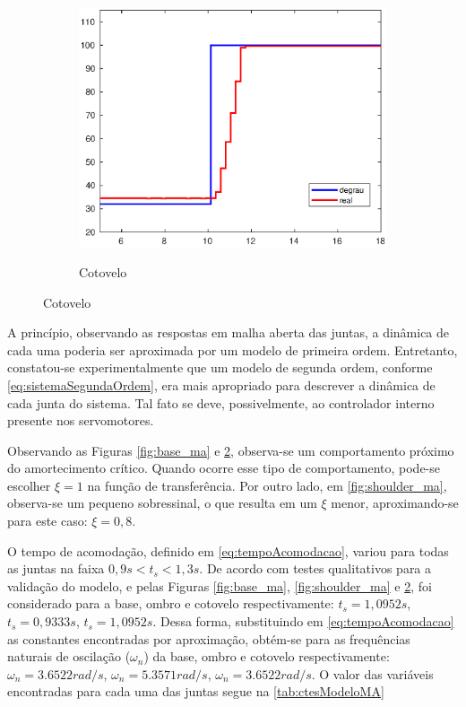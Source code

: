 \begin{figure}[h!]\ContinuedFloat
  \begin{subfigure}{\textwidth}
    \centering
    \caption{Cotovelo}
    \includegraphics[width = 0.55\columnwidth]{Imagens/forearm_ma}
    \label{fig:forearm_ma}
  \end{subfigure}%
\end{figure}

A princípio, observando as respostas em malha aberta das juntas, a dinâmica de cada uma poderia ser aproximada por
um modelo de primeira ordem. Entretanto, constatou-se experimentalmente que um modelo de segunda ordem, 
conforme \eqref{eq:sistemaSegundaOrdem}, era mais apropriado para descrever a dinâmica de cada junta do sistema.
Tal fato se deve, possivelmente, ao controlador interno presente nos servomotores.

Observando as Figuras \ref{fig:base_ma} e \ref{fig:forearm_ma}, observa-se um comportamento próximo do 
amortecimento crítico. Quando ocorre esse tipo de comportamento, pode-se escolher $\xi=1$ na função de 
transferência. Por outro lado, em \ref{fig:shoulder_ma}, observa-se
um pequeno sobressinal, o que resulta em um $\xi$ menor, aproximando-se para este caso: $\xi = 0,8$.

O tempo de acomodação, definido em \eqref{eq:tempoAcomodacao}, variou para todas as juntas na 
faixa $0,9s < t_s < 1,3s$. De acordo com testes qualitativos para a validação do modelo, e pelas Figuras 
\ref{fig:base_ma}, \ref{fig:shoulder_ma} e \ref{fig:forearm_ma}, foi considerado para a base, ombro e
cotovelo respectivamente: $t_s = 1,0952s$, $t_s = 0,9333s$, $t_s = 1,0952s$. Dessa forma, substituindo em 
\eqref{eq:tempoAcomodacao} as constantes encontradas por aproximação, obtém-se para as frequências naturais de
oscilação ($\omega_n$) da base, ombro e
cotovelo respectivamente: $\omega_n = 3.6522 rad/s$, $\omega_n = 5.3571 rad/s$, $\omega_n = 3.6522 rad/s$.
O valor das variáveis encontradas para cada uma das juntas segue na \autoref{tab:ctesModeloMA}

